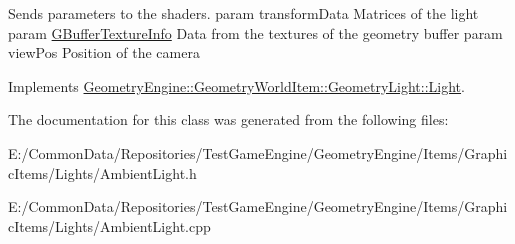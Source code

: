 Sends parameters to the shaders. param transform\+Data Matrices of the light param \mbox{\hyperlink{struct_geometry_engine_1_1_g_buffer_texture_info}{G\+Buffer\+Texture\+Info}} Data from the textures of the geometry buffer param view\+Pos Position of the camera 

Implements \mbox{\hyperlink{class_geometry_engine_1_1_geometry_world_item_1_1_geometry_light_1_1_light_a366be5945389fe58df4bf5aa8c43138f}{Geometry\+Engine\+::\+Geometry\+World\+Item\+::\+Geometry\+Light\+::\+Light}}.



The documentation for this class was generated from the following files\+:\begin{DoxyCompactItemize}
\item 
E\+:/\+Common\+Data/\+Repositories/\+Test\+Game\+Engine/\+Geometry\+Engine/\+Items/\+Graphic\+Items/\+Lights/Ambient\+Light.\+h\item 
E\+:/\+Common\+Data/\+Repositories/\+Test\+Game\+Engine/\+Geometry\+Engine/\+Items/\+Graphic\+Items/\+Lights/Ambient\+Light.\+cpp\end{DoxyCompactItemize}

